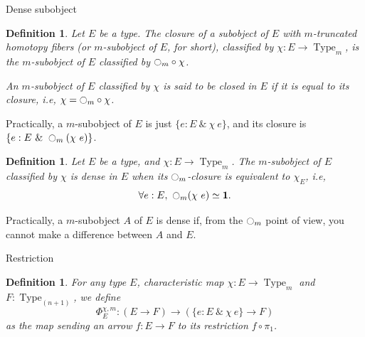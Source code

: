 \documentclass{beamer}
\newtheorem{defi}[thm]{Definition}
\newcommand{\ie}{i.e,\xspace}
\DeclareMathOperator{\Type}{Type}
\newcommand{\modal}{\ensuremath{\ocircle}}
\newcommand \one {\mathbf{1}}
\newcommand{\nType}[1]{\Type_{#1}}
\begin{document}
\begin{frame}[allowframebreaks]{Dense subobject}
  \begin{defi}
    Let $E$ be a type. The {\em closure} of a subobject of $E$ with
    $m$-truncated homotopy fibers (or $m$-subobject of $E$, for short),
    classified by $\chi : E \to \nType m$, is the $m$-subobject of $E$
    classified by $\modal_m \circ \chi$.


    An $m$-subobject of $E$ classified by $\chi$ is said to be {\em
      closed in $E$} if it is equal to its closure, \ie
    $\chi = \modal_m \circ \chi$.
  \end{defi}

  Practically, a $m$-subobject of $E$ is just $\{e:E ~\&~ \chi~e\}$, and
  its closure is $\{e:E~\&~\modal_m(\chi~e)\}$.
  \framebreak
  \begin{defi}
    Let $E$ be a type, and $\chi:E \to \nType m$. The $m$-subobject of $E$
    classified by $\chi$ is {\em dense} in $E$ when its $\modal_m$-closure
    is equivalent to $\chi_E$, \ie
    $$\forall e:E,~ \modal_m  (\chi~e) \simeq \one.$$
  \end{defi}

  Practically, a $m$-subobject $A$ of $E$ is dense if, from the $\modal_m$ point of
  view, you cannot make a difference between $A$ and $E$.
  
\end{frame}

\begin{frame}{Restriction}
  \note{ }
  \begin{defi}
    For any type $E$, characteristic map $\chi : E \to \nType m$ and $F:\nType {(n+1)}$, we define
    $$
    \Phi_E^{\chi,m} : (E \to F) \to (\{e:E~\&~\chi~e\} \to F) 
    $$
    as the map sending an
    arrow $f:E\to F$ to its restriction $f \circ \pi_1$.
  \end{defi}
\end{frame}
\end{document}
